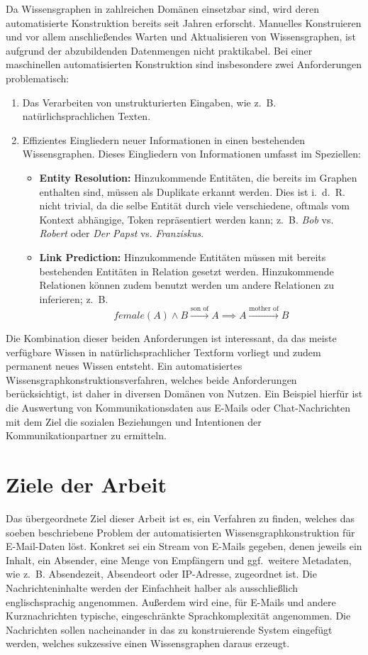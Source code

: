 Da Wissensgraphen in zahlreichen Domänen einsetzbar sind, wird deren automatisierte Konstruktion bereits seit Jahren erforscht.
Manuelles Konstruieren und vor allem anschließendes Warten und Aktualisieren von Wissensgraphen, ist aufgrund der abzubildenden Datenmengen nicht praktikabel.
Bei einer maschinellen automatisierten Konstruktion sind insbesondere zwei Anforderungen problematisch:
\begin{enumerate}
	\item Das Verarbeiten von unstrukturierten Eingaben, wie z.~B. natürlichsprachlichen Texten.
	\item Effizientes Eingliedern neuer Informationen in einen bestehenden Wissensgraphen.
		Dieses Eingliedern von Informationen umfasst im Speziellen:
		\begin{itemize}
			\item \textbf{Entity Resolution:}
				Hinzukommende Entitäten, die bereits im Graphen enthalten sind, müssen als Duplikate erkannt werden.
				Dies ist i.~d.~R. nicht trivial, da die selbe Entität durch viele verschiedene, oftmals vom Kontext abhängige, Token repräsentiert werden kann;
				z.~B. \textit{Bob} vs. \textit{Robert} oder \textit{Der Papst} vs. \textit{Franziskus}.
			\item \textbf{Link Prediction:}
				Hinzukommende Entitäten müssen mit bereits bestehenden Entitäten in Relation gesetzt werden.
				Hinzukommende Relationen können zudem benutzt werden um andere Relationen zu inferieren;
				z.~B. \[female(A) \land B \xrightarrow{\text{son~of}} A \implies A \xrightarrow{\text{mother~of}} B\]
		\end{itemize}
\end{enumerate}

Die Kombination dieser beiden Anforderungen ist interessant, da das meiste verfügbare Wissen in natürlichsprachlicher Textform vorliegt und zudem permanent neues Wissen entsteht.
Ein automatisiertes Wissensgraphkonstruktionsverfahren, welches beide Anforderungen berücksichtigt, ist daher in diversen Domänen von Nutzen.
Ein Beispiel hierfür ist die Auswertung von Kommunikationsdaten aus E-Mails oder Chat-Nachrichten mit dem Ziel die sozialen Beziehungen und Intentionen der Kommunikationpartner zu ermitteln.

\section{Ziele der Arbeit}%
\label{sec:intro:goals}

Das übergeordnete Ziel dieser Arbeit ist es, ein Verfahren zu finden, welches das soeben beschriebene Problem der automatisierten Wissensgraphkonstruktion für E-Mail-Daten löst.
Konkret sei ein Stream von E-Mails gegeben, denen jeweils ein Inhalt, ein Absender, eine Menge von Empfängern und ggf.\ weitere Metadaten, wie z.~B. Absendezeit, Absendeort oder IP-Adresse, zugeordnet ist.
Die Nachrichteninhalte werden der Einfachheit halber als ausschließlich englischsprachig angenommen.
Außerdem wird eine, für E-Mails und andere Kurznachrichten typische, eingeschränkte Sprachkomplexität angenommen.
Die Nachrichten sollen nacheinander in das zu konstruierende System eingefügt werden, welches sukzessive einen Wissensgraphen daraus erzeugt.

